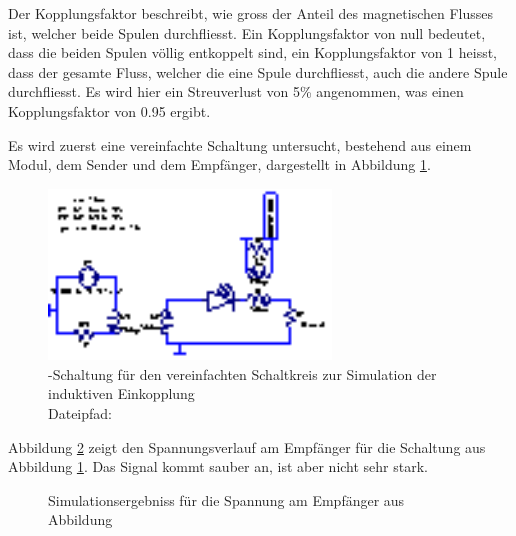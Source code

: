 Der Kopplungsfaktor beschreibt, wie gross  der Anteil des magnetischen Flusses
ist, welcher beide Spulen durchfliesst. Ein Kopplungsfaktor von null bedeutet,
dass die  beiden Spulen  v\"ollig entkoppelt sind,  ein Kopplungsfaktor  von 1
heisst, dass der gesamte Fluss, welcher  die eine Spule durchfliesst, auch die
andere Spule durchfliesst.  Es wird  hier ein Streuverlust von 5\% angenommen,
was einen Kopplungsfaktor von 0.95 ergibt.

Es  wird   zuerst  eine  vereinfachte  Schaltung   untersucht,  bestehend  aus
einem  Modul,  dem  Sender  und  dem  Empf\"anger,  dargestellt  in  Abbildung
\ref{fig:ltspice:inductive:singleModule}.

\begin{figure}[h!tb]
    \centering
    \includegraphics[width=0.67\textwidth]{images/ltspice/jac/inductive-singleModule.eps}
    \caption[Induktive Einkopplung, vereinfachte -Schaltung]{%
        -Schaltung f\"ur den vereinfachten Schaltkreis zur
        Simulation der induktiven Einkopplung\protect\\
        Dateipfad: %
    }
    \label{fig:ltspice:inductive:singleModule}
\end{figure}

Abbildung  \ref{fig:simu:inductive:singleModule}  zeigt  den  Spannungsverlauf
am      Empf\"anger      f\"ur      die      Schaltung      aus      Abbildung
\ref{fig:ltspice:inductive:singleModule}. Das Signal kommt sauber an, ist aber
nicht sehr stark.

\begin{figure}[h!tb]
    
    \caption[Simulationsergebniss induktive Einkopplung, vereinfachte Schaltung]{%
        Simulationsergebniss f\"ur die Spannung am Empf\"anger aus Abbildung
        \label{fig:ltspice:inductive:singleModule}%
    }
    \label{fig:simu:inductive:singleModule}
\end{figure}

